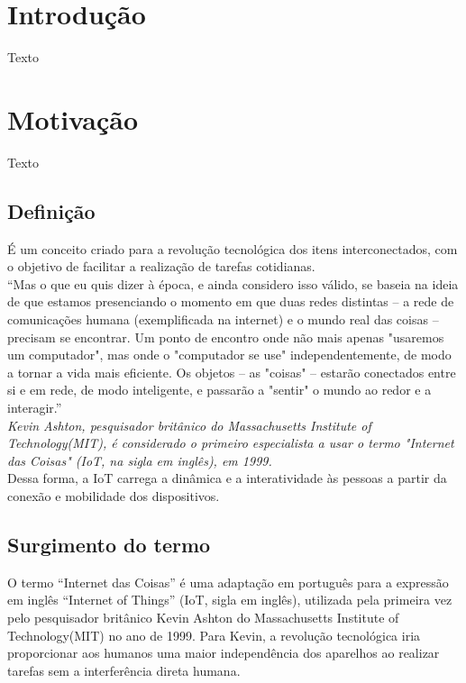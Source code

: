 \documentclass[11pt]{classe_cn}                 %
\begin{document}
\section{Introdução}
Texto

\section{Motivação}
Texto

\subsection{Definição} %
É um conceito criado para a revolução tecnológica dos itens interconectados, 
com o objetivo de facilitar a realização de tarefas cotidianas.\\

“Mas o que eu quis dizer à época, e ainda considero isso válido, se baseia 
na ideia de que estamos presenciando o momento em que duas redes distintas – 
a rede de comunicações humana (exemplificada na internet) e o mundo real das coisas – 
precisam se encontrar. Um ponto de encontro onde não mais apenas "usaremos um 
computador", mas onde o "computador se use" independentemente, de modo a tornar a
vida mais eficiente. Os objetos – as "coisas" – estarão conectados entre si e em rede, 
de modo inteligente, e passarão a "sentir" o mundo ao redor e a interagir.”\\  

\textit{Kevin Ashton, pesquisador britânico do Massachusetts Institute of Technology(MIT), 
é considerado o primeiro especialista a usar o termo "Internet das Coisas" (IoT, na sigla em inglês), em 1999.}\\

Dessa forma, a IoT carrega a dinâmica e a interatividade às pessoas a partir 
da conexão e mobilidade dos dispositivos. 

\subsection{Surgimento do termo} %
O termo “Internet das Coisas” é uma adaptação em português para a expressão em 
inglês “Internet of Things” (IoT, sigla em inglês), utilizada pela primeira 
vez pelo pesquisador britânico Kevin Ashton do Massachusetts Institute of 
Technology(MIT) no ano de 1999. Para Kevin, a revolução tecnológica iria 
proporcionar aos humanos uma maior independência dos aparelhos ao realizar 
tarefas sem a interferência direta humana.\\
\end{document}
